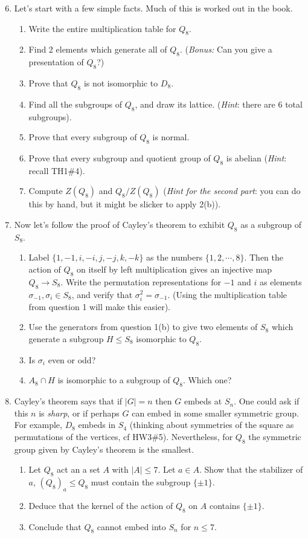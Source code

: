 \documentclass[11pt]{article}
\begin{document}
\begin{enumerate}
  \setcounter{enumi}{5}
  \item Let's start with a few simple facts.  Much of this is worked out in the book.
  \begin{enumerate}
    \item Write the entire multiplication table for $Q_8$.
    \item Find 2 elements which generate all of $Q_8$.  (\textit{Bonus:} Can you give a presentation of $Q_8$?)
    \item Prove that $Q_8$ is not isomorphic to $D_8$.
    \item Find all the subgroups of $Q_8$, and draw its lattice.  (\textit{Hint}: there are 6 total subgroups).
    \item Prove that every subgroup of $Q_8$ is normal.
    \item Prove that every subgroup and quotient group of $Q_8$ is abelian (\textit{Hint}: recall TH1\#4).
    \item Compute $Z(Q_8)$ and $Q_8/Z(Q_8)$ (\textit{Hint for the second part}: you can do this by hand, but it might be slicker to apply 2(b)).
  \end{enumerate}
  \item Now let's follow the proof of Cayley's theorem to exhibit $Q_8$ as a subgroup of $S_8$.
  \begin{enumerate}
    \item Label $\{1,-1,i,-i,j,-j,k,-k\}$ as the numbers $\{1,2,\cdots,8\}$. Then the action of $Q_8$ on itself by left multiplication gives an injective map $Q_8\to S_8$.  Write the permutation representations for $-1$ and $i$ as elements $\sigma_{-1},\sigma_i\in S_8$, and verify that $\sigma_i^2 = \sigma_{-1}$.  (Using the multiplication table from question 1 will make this easier).
    \item Use the generators from question 1(b) to give two elements of $S_8$ which generate a subgroup $H\le S_8$ isomorphic to $Q_8$.
    \item Is $\sigma_i$ even or odd?
    \item $A_8\cap H$ is isomorphic to a subgroup of $Q_8$.  Which one?
  \end{enumerate}
  \item Cayley's theorem says that if $|G|=n$ then $G$ embeds at $S_n$.  One could ask if this $n$ is \textit{sharp}, or if perhaps $G$ can embed in some smaller symmetric group.  For example, $D_8$ embeds in $S_4$ (thinking about symmetries of the square as permutations of the vertices, cf HW3\#5).  Nevertheless, for $Q_8$ the symmetric group given by Cayley's theorem is the smallest.
  \begin{enumerate}
    \item Let $Q_8$ act an a set $A$ with $|A|\le 7$.  Let $a\in A$.  Show that the stabilizer of $a$,  $(Q_8)_a\le Q_8$ must contain the subgroup $\{\pm1\}$.
    \item Deduce that the kernel of the action of $Q_8$ on $A$ contains $\{\pm1\}$.
    \item Conclude that $Q_8$ cannot embed into $S_n$ for $n\le7$.
  \end{enumerate}
\end{enumerate}
\end{document}

